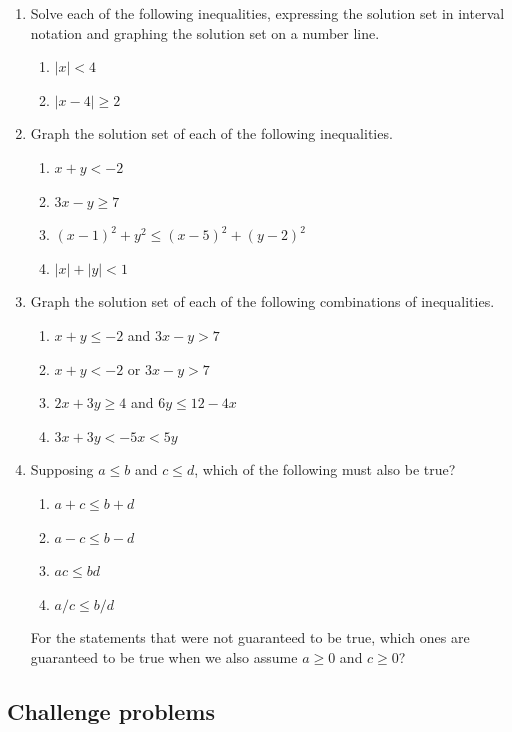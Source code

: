 \begin{enumerate}
\begin{enumerate}
\end{enumerate}
\item Solve each of the following inequalities, expressing the solution set in interval notation and graphing the solution set on a number line.
\begin{enumerate}
\item $\lvert x\rvert < 4$
\item $\lvert x - 4\rvert\geq 2$
\end{enumerate}
\item Graph the solution set of each of the following inequalities.
\begin{enumerate}
\item $x + y < -2$
\item $3x - y\geq 7$
\item $(x - 1)^2 + y^2\leq (x - 5)^2 + (y - 2)^2$
\item $\lvert x\rvert + \lvert y\rvert < 1$
\end{enumerate}
\item Graph the solution set of each of the following combinations of inequalities.
\begin{enumerate}
\item $x + y\leq -2$ and $3x - y > 7$
\item $x + y < -2$ or $3x - y > 7$
\item $2x + 3y\geq 4$ and $6y\leq 12 - 4x$
\item $3x + 3y < -5x < 5y$
\end{enumerate}
\item Supposing $a\leq b$ and $c\leq d$, which of the following must also be true?
\begin{enumerate}[label=(\Roman*)]
\item $a + c\leq b + d$
\item $a - c\leq b - d$
\item $ac\leq bd$
\item $a/c\leq b/d$
\end{enumerate}
For the statements that were not guaranteed to be true, which ones are guaranteed to be true when we also assume $a\geq 0$ and $c\geq 0$?
\end{enumerate}


\subsection{Challenge problems}

